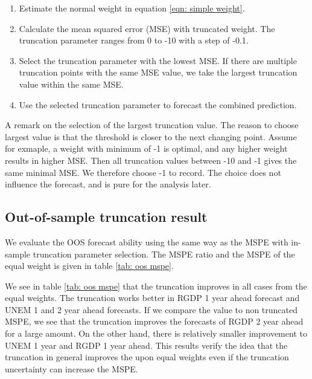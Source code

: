 \documentclass[]{article}
\begin{document}
\begin{enumerate}
\def\labelenumi{\arabic{enumi}.}
\item
  Estimate the normal weight in equation \ref{eqn: simple weight}.
\item
  Calculate the mean squared error (MSE) with truncated weight. The
  truncation parameter ranges from 0 to -10 with a step of -0.1.
\item
  Select the truncation parameter with the lowest MSE. If there are
  multiple truncation points with the same MSE value, we take the
  largest truncation value within the same MSE.
\item
  Use the selected truncation parameter to forecast the combined
  prediction.
\end{enumerate}

A remark on the selection of the largest truncation value. The reason to
choose largest value is that the threshold is closer to the next
changing point. Assume for exmaple, a weight with minimum of -1 is
optimal, and any higher weight results in higher MSE. Then all
truncation values between -10 and -1 gives the same minimal MSE. We
therefore choose -1 to record. The choice does not influence the
forecast, and is pure for the analysis later.

\subsection{Out-of-sample truncation
result}\label{out-of-sample-truncation-result}

We evaluate the OOS forecast ability using the same way as the MSPE with
in-sample truncation parameter selection. The MSPE ratio and the MSPE of
the equal weight is given in table \ref{tab: oos mspe}.

We see in table \ref{tab: oos mspe} that the truncation improves in all
cases from the equal weights. The truncation works better in RGDP 1 year
ahead forecast and UNEM 1 and 2 year ahead forecasts. If we compare the
value to non truncated MSPE, we see that the truncation improves the
forecasts of RGDP 2 year ahead for a large amount. On the other hand,
there is relatively smaller improvement to UNEM 1 year and RGDP 1 year
ahead. This results verify the idea that the truncation in general
improves the upon equal weights even if the truncation uncertainty can
increase the MSPE.
\end{document}
